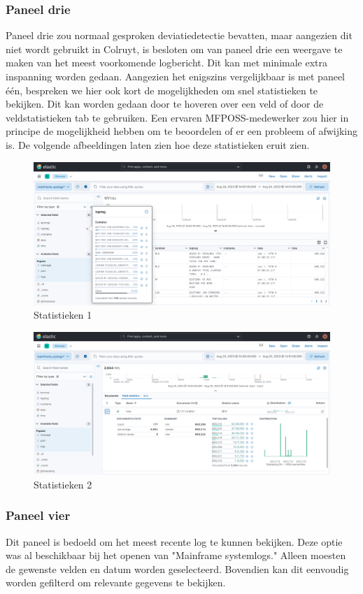 \subsubsection{Paneel drie}
Paneel drie zou normaal gesproken deviatiedetectie bevatten, maar aangezien dit niet wordt gebruikt in Colruyt, is besloten om van paneel drie een weergave te maken van het meest voorkomende logbericht. Dit kan met minimale extra inspanning worden gedaan. Aangezien het enigszins vergelijkbaar is met paneel één, bespreken we hier ook kort de mogelijkheden om snel statistieken te bekijken. Dit kan worden gedaan door te hoveren over een veld of door de veldstatistieken tab te gebruiken. Een ervaren MFPOSS-medewerker zou hier in principe de mogelijkheid hebben om te beoordelen of er een probleem of afwijking is. De volgende afbeeldingen laten zien hoe deze statistieken eruit zien.

\begin{figure}[h]
    \centering
    \includegraphics[width=0.50\linewidth]{bachproef//graphics/Kibana_stats_1.png}
    \caption{Statistieken 1}
    \label{fig:Statistieken 1}
\end{figure}

\begin{figure}[h]
    \centering
    \includegraphics[width=0.50\linewidth]{Kibana_stats_2.png}
    \caption{Statistieken 2}
    \label{fig:Statistieken 2}
\end{figure}
\clearpage
\subsubsection{Paneel vier}
Dit paneel is bedoeld om het meest recente log te kunnen bekijken. Deze optie was al beschikbaar bij het openen van "Mainframe systemlogs." Alleen moesten de gewenste velden en datum worden geselecteerd. Bovendien kan dit eenvoudig worden gefilterd om relevante gegevens te bekijken.

